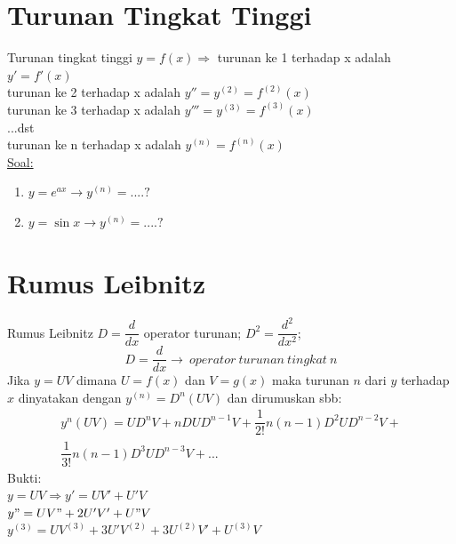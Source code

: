 \documentclass{beamer}
\begin{document}
\section{Turunan Tingkat Tinggi}
\begin{frame}[t, fragile]{Turunan tingkat tinggi}
$y=f(x) \Longrightarrow$ turunan ke 1 terhadap x adalah $ y'=f'(x)$\\
\hspace*{62px} turunan ke 2 terhadap x adalah $ y''=y^{(2)}=f^{(2)}(x)$\\
\hspace*{62px} turunan ke 3 terhadap x adalah $ y'''=y^{(3)}=f^{(3)}(x)$\\
\hspace*{62px} ...dst \\
\hspace*{62px} turunan ke n terhadap x adalah $y^{(n)}=f^{(n)}(x)$\\
\underline{Soal:}\\
\begin{enumerate}
\item $y=e^{ax} \rightarrow y^{(n)}=....? $
\item $y=\sin x\rightarrow y^{(n)}=....? $
\end{enumerate}
\end{frame}

\section{Rumus Leibnitz}
\begin{frame}[t, fragile]{Rumus Leibnitz}
$D=\dfrac{d}{dx}$ operator turunan; $D^2=\dfrac{d^2}{dx^2}$;\\
$$D=\dfrac{d}{dx} \rightarrow ~operator~turunan~tingkat~n$$
Jika $y=UV$ dimana $U=f(x)$ dan $V=g(x)$ maka turunan $n$ dari $y$ terhadap $x$ dinyatakan dengan $y^{(n)}=D^n(UV)$ dan dirumuskan sbb:
\begin{multline}
y^n(UV)=UD^nV+nDUD^{n-1}V+\dfrac{1}{2!}n(n-1)D^2UD^{n-2}V+\\
\dfrac{1}{3!}n(n-1)D^3UD^{n-3}V+...
\end{multline}
Bukti:\\
$y=UV \Longrightarrow y'=UV'+U'V$ \\
\hspace{60px}$y"=UV"+2U'V'+U"V$\\
\hspace{60px}$y^{(3)}=UV^{(3)}+3U'V^{(2)}+3U^{(2)}V'+U^{(3)}V$
\end{frame}
\end{document}
